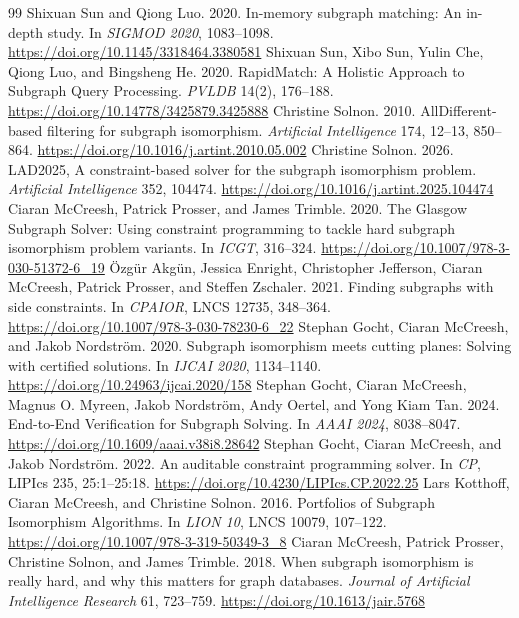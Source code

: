 \begin{thebibliography}{99}
 Shixuan Sun and Qiong Luo. 2020. In-memory subgraph matching: An in-depth study. In \textit{SIGMOD 2020}, 1083--1098. \url{https://doi.org/10.1145/3318464.3380581}
 Shixuan Sun, Xibo Sun, Yulin Che, Qiong Luo, and Bingsheng He. 2020. RapidMatch: A Holistic Approach to Subgraph Query Processing. \textit{PVLDB} 14(2), 176--188. \url{https://doi.org/10.14778/3425879.3425888}
 Christine Solnon. 2010. AllDifferent-based filtering for subgraph isomorphism. \textit{Artificial Intelligence} 174, 12--13, 850--864. \url{https://doi.org/10.1016/j.artint.2010.05.002}
 Christine Solnon. 2026. LAD2025, A constraint-based solver for the subgraph isomorphism problem. \textit{Artificial Intelligence} 352, 104474. \url{https://doi.org/10.1016/j.artint.2025.104474}
 Ciaran McCreesh, Patrick Prosser, and James Trimble. 2020. The Glasgow Subgraph Solver: Using constraint programming to tackle hard subgraph isomorphism problem variants. In \textit{ICGT}, 316--324. \url{https://doi.org/10.1007/978-3-030-51372-6_19}
 \"{O}zg\"{u}r Akg\"{u}n, Jessica Enright, Christopher Jefferson, Ciaran McCreesh, Patrick Prosser, and Steffen Zschaler. 2021. Finding subgraphs with side constraints. In \textit{CPAIOR}, LNCS 12735, 348--364. \url{https://doi.org/10.1007/978-3-030-78230-6_22}
 Stephan Gocht, Ciaran McCreesh, and Jakob Nordstr\"om. 2020. Subgraph isomorphism meets cutting planes: Solving with certified solutions. In \textit{IJCAI 2020}, 1134--1140. \url{https://doi.org/10.24963/ijcai.2020/158}
 Stephan Gocht, Ciaran McCreesh, Magnus O. Myreen, Jakob Nordstr\"om, Andy Oertel, and Yong Kiam Tan. 2024. End-to-End Verification for Subgraph Solving. In \textit{AAAI 2024}, 8038--8047. \url{https://doi.org/10.1609/aaai.v38i8.28642}
 Stephan Gocht, Ciaran McCreesh, and Jakob Nordstr\"{o}m. 2022. An auditable constraint programming solver. In \textit{CP}, LIPIcs 235, 25:1--25:18. \url{https://doi.org/10.4230/LIPIcs.CP.2022.25}
 Lars Kotthoff, Ciaran McCreesh, and Christine Solnon. 2016. Portfolios of Subgraph Isomorphism Algorithms. In \textit{LION 10}, LNCS 10079, 107--122. \url{https://doi.org/10.1007/978-3-319-50349-3_8}
 Ciaran McCreesh, Patrick Prosser, Christine Solnon, and James Trimble. 2018. When subgraph isomorphism is really hard, and why this matters for graph databases. \textit{Journal of Artificial Intelligence Research} 61, 723--759. \url{https://doi.org/10.1613/jair.5768}

\end{thebibliography}
